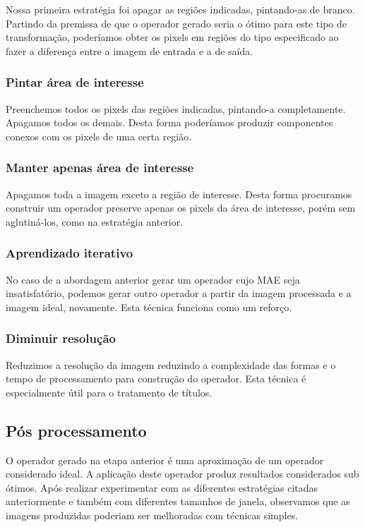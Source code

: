 \documentclass[a4paper,11pt]{article}
\begin{document}
        Nossa primeira estratégia foi apagar as regiões indicadas, pintando-as de branco. Partindo da premissa de que o operador gerado seria o ótimo para este tipo de transformação, poderíamos obter os pixels em regiões do tipo especificado ao fazer a diferença entre a imagem de entrada e a de saída.

      \subsubsection{Pintar área de interesse}

        Preenchemos todos os pixels das regiões indicadas, pintando-a completamente. Apagamos todos os demais. Desta forma poderíamos produzir componentes conexos com os pixels de uma certa região.

      \subsubsection{Manter apenas área de interesse}

        Apagamos toda a imagem exceto a região de interesse. Desta forma procuramos construir um operador preserve apenas os pixels da área de interesse, porém sem aglutiná-los, como na estratégia anterior.

      \subsubsection{Aprendizado iterativo}

        No caso de a abordagem anterior gerar um operador cujo MAE seja insatisfatório, podemos gerar outro operador a partir da imagem processada e a imagem ideal, novamente. Esta técnica funciona como um reforço.

      \subsubsection{Diminuir resolução}

        Reduzimos a resolução da imagem reduzindo a complexidade das formas e o tempo de processamento para construção do operador. Esta técnica é especialmente útil para o tratamento de títulos.

    \subsection{Pós processamento}

      O operador gerado na etapa anterior é uma aproximação de um operador considerado ideal. A aplicação deste operador produz resultados considerados sub ótimos. Após realizar experimentar com as diferentes estratégias citadas anteriormente e também com diferentes tamanhos de janela, observamos que as imagens produzidas poderiam ser melhoradas com técnicas simples.
\end{document}
